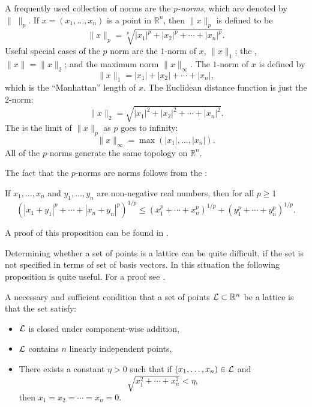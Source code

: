 A frequently used collection of norms are the {\em
$p$-norms}, which are
denoted by $\|\;\|_{p}$.  If $x = (x_{1}, \ldots, x_{n})$ is a point
in $\mathbb{R}^{n}$, then $\|x\|_{p}$ is defined to be
\[
\|x\|_{p} = \sqrt[p]{|x_{1}|^{p} + |x_{2}|^{p} + \cdots + |x_{n}|^{p}}.
\]
Useful special cases of the $p$ norm are the $1$-norm of $x$,
$\|x\|_{1}$; the , $\|x\| = \|x\|_{2}$; and the
maximum norm $\|x\|_{\infty}$.  The $1$-norm of $x$ is defined by
\[
\|x\|_{1} = |x_{1}| + |x_{2}| + \cdots + |x_{n}|,
\]
which is the ``Manhattan'' length of $x$. The
Euclidean distance function is just the $2$-norm:
\[
\|x\|_{2} = \sqrt{|x_{1}|^{2} + |x_{2}|^{2} + \cdots + |x_{n}|^{2}}.
\]
The  is the limit of $\|x\|_{p}$ as $p$ goes to
infinity:
\[
\|x\|_{\infty} = \max (|x_{1}|, \ldots, |x_{n}|).
\]
All of the $p$-norms generate the same topology on $\mathbb{R}^{n}$.

The fact that the $p$-norms are norms follows from the  \cite[pages 115--117]{Minkowski2018-iz}:

\begin{proposition}[{\Minkowski}]
If $x_1, \ldots, x_n$ and $y_1, \ldots, y_n$ are non-nega\-tive real
numbers, then for all $p \ge 1$
\[
\left(|x_1 + y_1|^p + \cdots + |x_n + y_n|^p\right)^{1/p} \le 
\left(x_1^p + \cdots + x_n^p\right)^{1/p} + 
\left(y_1^p + \cdots + y_n^p\right)^{1/p}.
\]
\end{proposition}

\noindent
A proof of this proposition can be found in \cite{Hardy1952-ad}.

Determining whether a set of points is a lattice can be quite
difficult, if the set is not specified in terms of set of basis
vectors.  In this situation the following proposition is quite useful.
For a proof see {\Cassels} \cite[page 78]{Cassels2012-kd}.

\begin{proposition} \label{Lattice:Condition:Prop}
A necessary and sufficient condition that a set of points ${\cal L} \subset
\mathbb{R}^n$ be a lattice is that the set satisfy:
\begin{itemize}
\item ${\cal L}$ is closed under component-wise addition,
\item ${\cal L}$ contains $n$ linearly independent points,
\item There exists a constant $\eta> 0$ such that if $(x_1, \ldots,
x_n) \in {\cal L}$ and
\[
\sqrt{x_1^2 + \cdots + x_n^2} < \eta,
\]
then $x_1 = x_2 = \cdots = x_n = 0$.
\end{itemize}
\end{proposition}

